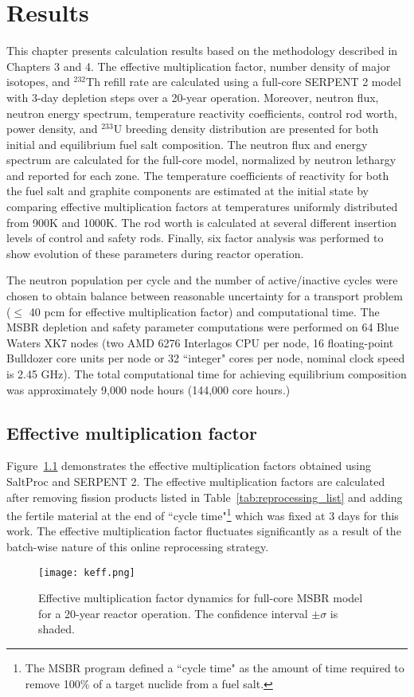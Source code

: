 \chapter[Results]{Results}

This chapter presents calculation results based on the methodology described in Chapters 3 and 4. The effective multiplication factor, number density of major isotopes, and $^{232}$Th refill rate are calculated using a full-core SERPENT 2 model with 3-day depletion steps over a 20-year operation. Moreover, neutron flux, neutron energy spectrum, temperature reactivity coefficients, control rod worth, power density, and $^{233}$U breeding density distribution are presented for both initial and equilibrium fuel salt composition. The neutron flux and energy spectrum are calculated for the full-core model, normalized by neutron lethargy and reported for each zone. The temperature coefficients of reactivity for both the fuel salt and graphite components are estimated at the initial state by comparing effective multiplication factors at temperatures uniformly distributed from 900K and 1000K. The rod worth is calculated at several different insertion levels of control and safety rods. Finally, six factor analysis was performed to show evolution of these parameters during reactor operation.

The neutron population per cycle and the number of active/inactive cycles were chosen to obtain balance between reasonable uncertainty for a transport problem ($\leq$ 40 pcm for effective multiplication factor) and computational time. The \gls{MSBR} depletion and safety parameter computations were performed on 64 Blue Waters XK7 nodes (two AMD 6276 Interlagos CPU per node, 16 floating-point Bulldozer core units per node or 32 ``integer" cores per node, nominal clock speed is 2.45 GHz). The total computational time for achieving equilibrium composition was approximately 9,000 node hours (144,000 core hours.)

\section{Effective multiplication factor}
Figure~\ref{fig:keff} demonstrates the effective multiplication factors obtained using SaltProc and SERPENT 2. The effective multiplication factors are calculated after removing fission products listed in Table~\ref{tab:reprocessing_list} and adding the fertile material at the end of ``cycle time"\footnote{The \gls{MSBR} program defined a ``cycle time" as the amount of time required to remove 100\% of a target nuclide from a fuel salt.} which was fixed at 3 days for this work. The effective multiplication factor fluctuates significantly as a result of the batch-wise nature of this online reprocessing strategy. 
\begin{figure}[hbp!] %
  \centering
  \vspace{-0.3em}
  \texttt{[image: keff.png]}
  \caption{Effective multiplication factor dynamics for full-core \gls{MSBR} model for a 20-year reactor operation. The confidence interval $\pm\sigma$ is shaded.}
  \vspace{-0.6em}
  \label{fig:keff}
\end{figure}
\FloatBarrier

